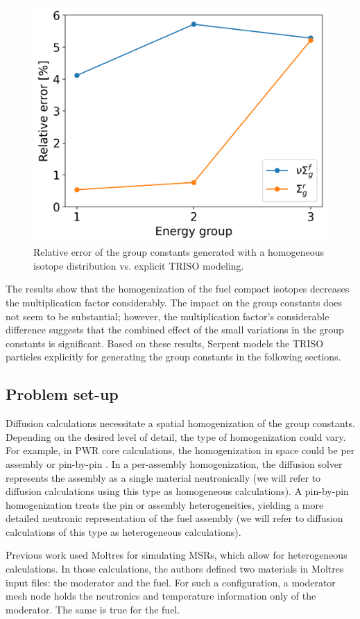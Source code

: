 \begin{figure}[htbp!]
	\centering
	\includegraphics[width=0.43\linewidth]{figures-neutronics/param-comparison}
	\hfill
	\caption{Relative error of the group constants generated with a homogeneous isotope distribution vs. explicit TRISO modeling.}
	\label{fig:param-comparison}
\end{figure}

The results show that the homogenization of the fuel compact isotopes decreases the multiplication factor considerably.
The impact on the group constants does not seem to be substantial; however, the multiplication factor's considerable difference suggests that the combined effect of the small variations in the group constants is significant.
Based on these results, Serpent models the TRISO particles explicitly for generating the group constants in the following sections.

\subsection{Problem set-up}
\label{sec:setup}

Diffusion calculations necessitate a spatial homogenization of the group constants.
Depending on the desired level of detail, the type of homogenization could vary.
For example, in PWR core calculations, the homogenization in space could be per assembly or pin-by-pin \cite{krebs_calculational_1990}.
In a per-assembly homogenization, the diffusion solver represents the assembly as a single material neutronically (we will refer to diffusion calculations using this type as homogeneous calculations).
A pin-by-pin homogenization treats the pin or assembly heterogeneities, yielding a more detailed neutronic representation of the fuel assembly (we will refer to diffusion calculations of this type as heterogeneous calculations).

Previous work \cite{lindsay_introduction_2018}\cite{pater_multiphysics_2019} used Moltres for simulating \glspl{MSR}, which allow for heterogeneous calculations.
In those calculations, the authors defined two materials in Moltres input files: the moderator and the fuel.
For such a configuration, a moderator mesh node holds the neutronics and temperature information only of the moderator.
The same is true for the fuel.

